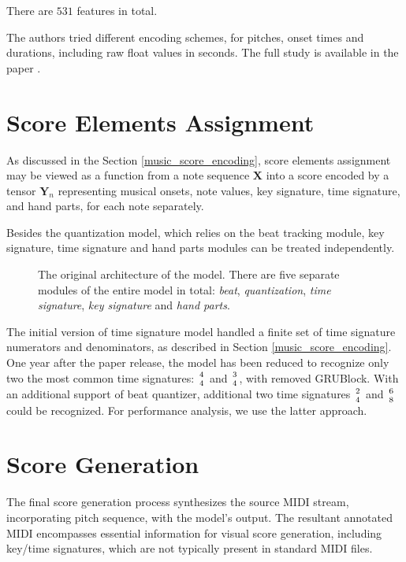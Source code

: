 There are $531$ features in total.

The authors tried different encoding schemes, for pitches, onset times and durations, including raw float values in seconds. The full study is available in the paper \cite{Liu2022}.

\section{Score Elements Assignment}

As discussed in the Section \ref{music_score_encoding}, score elements assignment may be viewed as a function from a note sequence $\mathbf{X}$ into a score encoded by a tensor $\mathbf{Y}_n$ representing musical onsets, note values, key signature, time signature, and hand parts, for each note separately.

Besides the quantization model, which relies on the beat tracking module, key signature, time signature and hand parts modules can be treated independently.

\begin{figure}[!ht]
\centering

\caption[The original architecture of the model.]{The original architecture of the model. There are five separate modules of the entire model in total: \emph{beat}, \emph{quantization}, \emph{time signature}, \emph{key signature} and \emph{hand parts}.}
\end{figure}

The initial version of time signature model handled a finite set of time signature numerators and denominators, as described in Section \ref{music_score_encoding}. One year after the paper release, the model has been reduced to recognize only two the most common time signatures: ${4 \atop 4}$ and ${3 \atop 4}$, with removed GRUBlock. With an additional support of beat quantizer, additional two time signatures ${2 \atop 4}$ and ${6 \atop 8}$ could be recognized.  For performance analysis, we use the latter approach.

\section{Score Generation}

The final score generation process synthesizes the source MIDI stream, incorporating pitch sequence, with the model's output. The resultant annotated MIDI encompasses essential information for visual score generation, including key/time signatures, which are not typically present in standard MIDI files.

